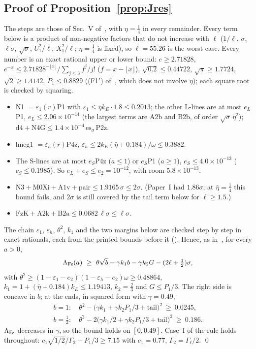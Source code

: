 \subsection{Proof of Proposition~\ref{prop:Jres}}
The steps are those of Sec.~V of~\cite{I}, with $\eta=\tfrac14$ in every remainder.
Every term below is a product of non-negative factors that do not increase with $\ell$ ($1/\ell$, $\sigma$, $\ell\sigma$, $\sqrt\sigma$, $U_1^2/\ell$, $X_1^2/\ell$; $\eta=\tfrac14$ is fixed), so $\ell=55.26$ is the worst case.
Every number is an exact rational upper or lower bound: $e\ge2.71828$, $e^{-x}\le2.71828^{-\lfloor x\rfloor}/\sum_{j\le3}f^j/j!$ ($f=x-\lfloor x\rfloor$), $\sqrt{0.2}\le0.44722$, $\sqrt\pi\ge1.7724$, $\sqrt2\ge1.4142$, $P_1\le0.8829$ ((F1$'$) of~\cite{I}, which does not involve $\eta$); each square root is checked by squaring.
\begin{itemize}
\item[(R1$'$)] N1 $=\varepsilon_1(r)$P1 with $\varepsilon_1\le\bar\eta k_E\cdot1.8\le0.2013$; the other L-lines are at most $e_L$P1, $e_L\le2.06\times10^{-14}$ (the largest terms are A2b and B2b, of order $\sqrt\sigma\,\bar\eta^2$); $\mathrm{d4}+\mathrm{N4G}\le1.4\times10^{-4}\,\mathrm{es}_\sigma\,$P2z.
\item[(R2$'$)] hneg1 $=\varepsilon_h(r)$P4z, $\varepsilon_h\le2k_E(\bar\eta+0.184)/\omega\le0.3882$.
\item[(R3$'$)] The S-lines are at most $e_S$P4z ($a\le1$) or $e_S$P1 ($a\ge1$), $e_S\le4.0\times10^{-13}$ ($c_S\le0.1985$). So $e_L+e_S\le e_2=10^{-12}$, with room $5.8\times10^{-13}$.
\item[(R4$'$)] $\mathrm{N3}+\mathrm{M0Xi}+\mathrm{A1v}+\mathrm{pair}\le1.9165\,\sigma\le2\sigma$. (Paper~I had $1.86\sigma$; at $\bar\eta=\tfrac14$ this bound fails, and $2\sigma$ is still covered by the tail term below for $\ell\ge1.5$.)
\item[(R5$'$)] $\mathrm{FzK}+\mathrm{A2k}+\mathrm{B2a}\le0.0682\,\ell\sigma\le\ell\sigma$.
\end{itemize}
The chain $\varepsilon_1$, $\varepsilon_h$, $\theta^2$, $k_1$ and the two margins below are checked step by step in exact rationals, each from the printed bounds before it ().
Hence, as in~\cite{I}, for every $a>0$,
\begin{equation}
\Lambda_{\rm Fz}(a)\ \ge\ \theta\sqrt b-\gamma k_1b-\gamma k_2G-(2\ell+\tfrac12)\sigma,
\end{equation}
with $\theta^2\ge(1-\varepsilon_1-e_2)(1-\varepsilon_h-e_2)\omega\ge0.48864$, $k_1=1+(\bar\eta+0.184)k_E\le1.19413$, $k_2=\tfrac23$ and $G\le P_1/3$.
The right side is concave in $b$; at the ends, in squared form with $\gamma=0.49$,
\begin{gather}
b=1:\quad \theta^2-\bigl(\gamma k_1+\gamma k_2P_1/3+\text{tail}\bigr)^2\ \ge\ 0.0245,\\
b=\tfrac12:\quad \theta^2-2\bigl(\gamma k_1/2+\gamma k_2P_1/3+\text{tail}\bigr)^2\ \ge\ 0.186 .
\end{gather}
$\Lambda_{\rm Fz}$ decreases in $\gamma$, so the bound holds on $[0,0.49]$.
Case~I of the rule holds throughout: $c_1\sqrt{1/2}/\Gamma_2-P_1/3\ge7.15$ with $c_1=0.77$, $\Gamma_2=\Gamma_\ell/2$.
\qed

